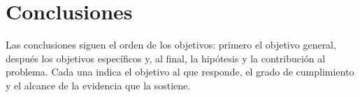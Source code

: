 \ifdefined\modoensamble
\else
	
\fi

\chapter{Conclusiones}
\label{cap:conclusiones}

Las conclusiones siguen el orden de los objetivos: primero el objetivo general, después los
objetivos específicos y, al final, la hipótesis y la contribución al problema. Cada una indica el
objetivo al que responde, el grado de cumplimiento y el alcance de la evidencia que la sostiene.

